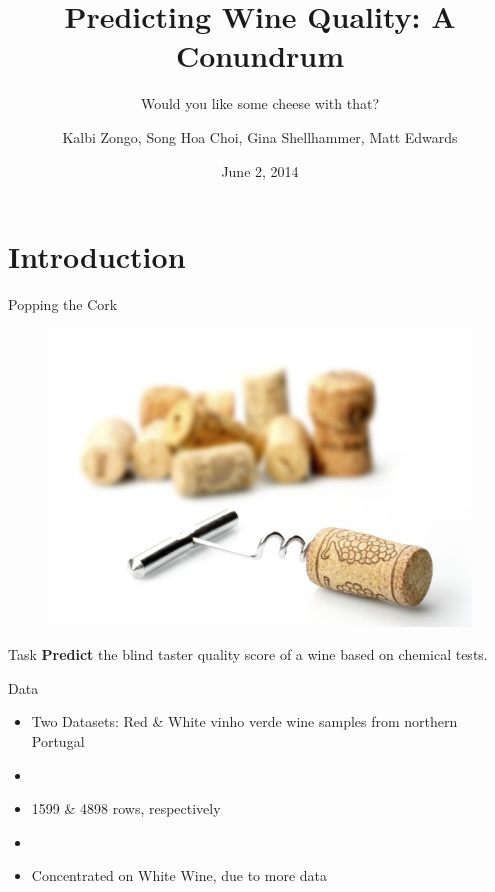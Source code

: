 \documentclass{beamer}
\title{Predicting Wine Quality: A Conundrum}
\subtitle{Would you like some cheese with that?}
\author{Kalbi Zongo, Song Hoa Choi, Gina Shellhammer, Matt Edwards}
\date{June 2, 2014}
\begin{document}
\begin{frame}
	\titlepage
\end{frame}


\section{Introduction}

\begin{frame}{Popping the Cork}
	\begin{figure}
		\centering
		\includegraphics[width=\textwidth]{../images/uncork.jpg}
	\end{figure}
\end{frame}


\begin{frame}{Task}
	\LARGE
	\textbf{Predict} the blind taster quality score of a wine based on chemical tests.

\end{frame}

\begin{frame}{Data}
\begin{itemize}
	\item Two Datasets: Red \& White vinho verde wine samples from northern Portugal
	\item[]
	\item 1599 \& 4898 rows, respectively
	\item[]
	\item Concentrated on White Wine, due to more data
\end{itemize}
\end{frame}
\end{document}
